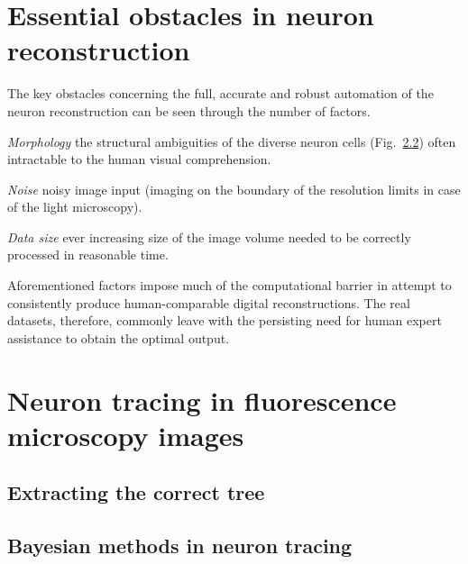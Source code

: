 \section{Essential obstacles in neuron reconstruction}
The key obstacles concerning the full, accurate and robust automation of the neuron reconstruction \cite{meijering2010neuron,donohue2011automated,acciai2016automated} can be seen through the number of factors.

\textit{Morphology} the structural ambiguities of the diverse neuron cells (Fig.~\ref{}) often intractable to the human visual comprehension.

\textit{Noise} noisy image input (imaging on the boundary of the resolution limits in case of the light microscopy).

\textit{Data size} ever increasing size of the image volume needed to be correctly processed in reasonable time.

Aforementioned factors impose much of the computational barrier \cite{peng2011proof,svoboda2011past} in attempt to consistently produce human-comparable digital reconstructions. The real datasets, therefore, commonly leave with the persisting need for human expert assistance to obtain the optimal output. 

\section{Neuron tracing in fluorescence microscopy images}

\subsection{Extracting the correct tree}

\subsection{Bayesian methods in neuron tracing}

